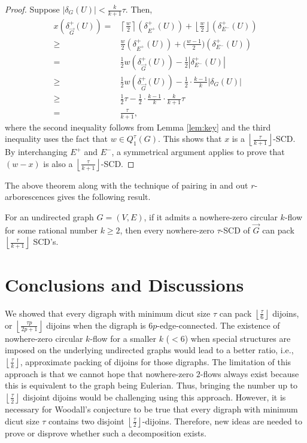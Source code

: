 \documentclass[runningheads]{llncs}
\newcommand{\rounddown}[1]{\left\lfloor#1\right\rfloor}
\newcommand{\roundup}[1]{\left\lceil#1\right\rceil}
\begin{document}
\begin{proof}
        Suppose $|\delta_G(U)|<\frac{k}{k+1}\tau$. Then, \[
        \begin{aligned}
            x(\delta_{\vec{G}}^+(U))=&\roundup{\frac{w}{2}}(\delta_{E^+}^+(U))+\rounddown{\frac{w}{2}}(\delta_{E^-}^+(U))\\
            \geq& \frac{w}{2}(\delta_{E^+}^+(U))+\big(\frac{w-1}{2}\big)(\delta_{E^-}^+(U))\\
            =&\frac{1}{2}w(\delta_{\vec{G}}^+(U))-\frac{1}{2}|\delta_{E^-}^+(U)|\\
        \geq& \frac{1}{2}w(\delta_{\vec{G}}^+(U))-\frac{1}{2}\cdot\frac{k-1}{k}|\delta_G(U)|\\
        \geq& \frac{1}{2}\tau-\frac{1}{2}\cdot\frac{k-1}{k}\cdot\frac{k}{k+1}\tau\\
        =&\frac{\tau}{k+1},
        \end{aligned}
        \]
        where the second inequality follows from Lemma \ref{lem:key} and the third inequality uses the fact that $w\in Q_1^\tau(G)$. This shows that $x$ is a $\rounddown{\frac{\tau}{k+1}}$-SCD.
        By interchanging $E^+$ and $E^-$, a symmetrical argument applies to prove that $(w-x)$ is also a $\rounddown{\frac{\tau}{k+1}}$-SCD.
\end{proof}



The above theorem along with the technique of pairing in and out $r$-arborescences gives the following result.

\begin{theorem}\label{thm:pack_SCD1}
    For an undirected graph $G=(V,E)$, if it admits a nowhere-zero circular $k$-flow for some rational number $k\geq 2$, then every nowhere-zero $\tau$-SCD of $\vec{G}$ can pack $\rounddown{\frac{\tau}{k+1}}$ SCD's.
\end{theorem}




\section{Conclusions and Discussions}
We showed that every digraph with minimum dicut size $\tau$ can pack $\rounddown{\frac{\tau}{6}}$ dijoins, or $\rounddown{\frac{\tau p}{2p+1}}$ dijoins when the digraph is $6p$-edge-connected. 
The existence of nowhere-zero circular $k$-flow for a smaller $k$ ($<6$) when special structures are imposed on the underlying undirected graphs would lead to a better ratio, i.e., $\rounddown{\frac{\tau}{k}}$, approximate packing of dijoins for those digraphs. 
The limitation of this approach is that we cannot hope that nowhere-zero $2$-flows always exist because this is equivalent to the graph being Eulerian. Thus, bringing the number up to $\rounddown{\frac{\tau}{2}}$ disjoint dijoins would be challenging using this approach. However, it is necessary for Woodall's conjecture to be true that every digraph with minimum dicut size $\tau$ contains two disjoint $\rounddown{\frac{\tau}{2}}$-dijoins. Therefore, new ideas are needed to prove or disprove whether such a decomposition exists.
\end{document}
